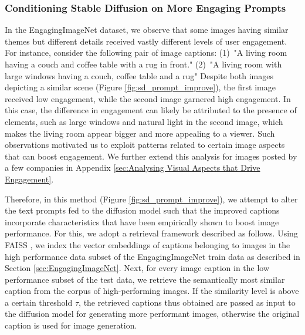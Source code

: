  

 
 
 \subsubsection{Conditioning Stable Diffusion on More Engaging Prompts}
 \label{sec:caption_improve}

In the EngagingImageNet dataset, we observe that some images having similar themes but different details received vastly different levels of user engagement. 
For instance, consider the following pair of image captions: 
(1)~"A living room having a couch and coffee table with a rug in front." 
(2)~"A living room with large windows having a couch, coffee table and a rug"
Despite both images depicting a similar scene (Figure \ref{fig:sd_prompt_improve}), the first image received low engagement, while the second image garnered high engagement. In this case, the difference in engagement can likely be attributed to the presence of elements, such as large windows and natural light in the second image, which makes the living room appear bigger and more appealing to a viewer. Such observations motivated us to exploit patterns related to certain image aspects that can boost engagement. We further extend this analysis for images posted by a few companies in Appendix \ref{sec:Analysing Visual Aspects that Drive Engagement}.
 
 Therefore, in this method (Figure \ref{fig:sd_prompt_improve}), we attempt to alter the text prompts fed to the diffusion model such that the improved captions 
incorporate characteristics that have been empirically shown to boost image performance.
 For this, we adopt a retrieval framework described as follows. Using FAISS \cite{johnson2019billion, douze2024faiss}, we index the vector embeddings of captions belonging to images in the high performance data subset of the EngagingImageNet train data as described in Section \ref{sec:EngagingImageNet}. Next, for every image caption in the low performance subset of the test data, we retrieve the semantically most similar caption from the corpus of high-performing images. If the similarity level is above a certain threshold $\tau$, the retrieved captions thus obtained are passed as input to the diffusion model for generating more performant images, otherwise the original caption is used for image generation.


